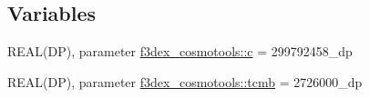 \subsection*{Variables}
\begin{DoxyCompactItemize}
\item 
REAL(DP), parameter \hyperlink{namespacef3dex__cosmotools_a211d492263b2040371280021352d9154}{f3dex\_\-cosmotools::c} = 299792458\_\-dp
\item 
REAL(DP), parameter \hyperlink{namespacef3dex__cosmotools_a8953fe6dc399fcf889789bee9702ee65}{f3dex\_\-cosmotools::tcmb} = 2726000\_\-dp
\end{DoxyCompactItemize}
